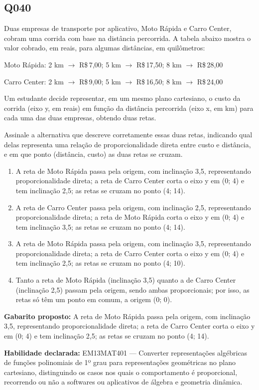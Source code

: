 \documentclass[11pt,a4paper]{article}
\begin{document}
\begin{samepage}
\subsection*{Q040}
Duas empresas de transporte por aplicativo, Moto Rápida e Carro Center, cobram uma corrida com base na distância percorrida. A tabela abaixo mostra o valor cobrado, em reais, para algumas distâncias, em quilômetros:

Moto Rápida: 2 km $\to$ R\$\,7,00; 5 km $\to$ R\$\,17,50; 8 km $\to$ R\$\,28,00

Carro Center: 2 km $\to$ R\$\,9,00; 5 km $\to$ R\$\,16,50; 8 km $\to$ R\$\,24,00

Um estudante decide representar, em um mesmo plano cartesiano, o custo da corrida (eixo y, em reais) em função da distância percorrida (eixo x, em km) para cada uma das duas empresas, obtendo duas retas.

Assinale a alternativa que descreve corretamente essas duas retas, indicando qual delas representa uma relação de proporcionalidade direta entre custo e distância, e em que ponto (distância, custo) as duas retas se cruzam.
\begin{enumerate}[label=(\alph*),nosep,leftmargin=*]
\item A reta de Moto Rápida passa pela origem, com inclinação 3,5, representando proporcionalidade direta; a reta de Carro Center corta o eixo y em (0; 4) e tem inclinação 2,5; as retas se cruzam no ponto (4; 14).
\item A reta de Carro Center passa pela origem, com inclinação 2,5, representando proporcionalidade direta; a reta de Moto Rápida corta o eixo y em (0; 4) e tem inclinação 3,5; as retas se cruzam no ponto (4; 14).
\item A reta de Moto Rápida passa pela origem, com inclinação 3,5, representando proporcionalidade direta; a reta de Carro Center corta o eixo y em (0; 4) e tem inclinação 2,5; as retas se cruzam no ponto (4; 10).
\item Tanto a reta de Moto Rápida (inclinação 3,5) quanto a de Carro Center (inclinação 2,5) passam pela origem, sendo ambas proporcionais; por isso, as retas só têm um ponto em comum, a origem (0; 0).
\end{enumerate}

\textbf{Gabarito proposto:} A reta de Moto Rápida passa pela origem, com inclinação 3,5, representando proporcionalidade direta; a reta de Carro Center corta o eixo y em (0; 4) e tem inclinação 2,5; as retas se cruzam no ponto (4; 14).

\textbf{Habilidade declarada:} EM13MAT401 --- Converter representações algébricas de funções polinomiais de 1º grau para representações geométricas no plano cartesiano, distinguindo os casos nos quais o comportamento é proporcional, recorrendo ou não a softwares ou aplicativos de álgebra e geometria dinâmica.
\end{samepage}
\end{document}
